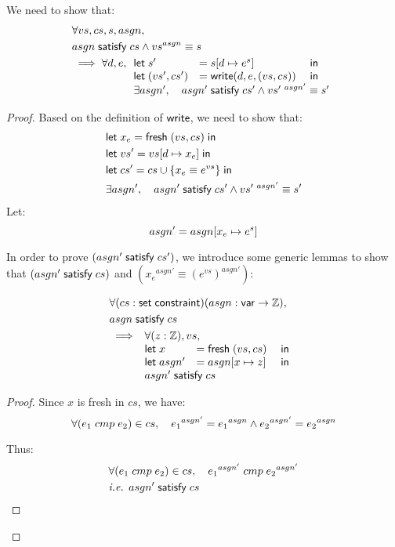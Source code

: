 We need to show that:
\begin{align*}
&\forall vs,cs,s,asgn,\\
&\satisfy{asgn}{cs}\wedge vs^{asgn}\equiv s\\
&\implies\forall d,e,\begin{array}[t]{lll}
\letin{s'&}{\update{s}{d}{e^s}&}\\
\letin{(vs',cs')&}{\Write(d,e,(vs,cs))&}\\
\multicolumn{3}{l}{\exists asgn',\quad\satisfy{asgn'}{cs'}\wedge vs'^{~asgn'}\equiv s'}
\end{array}
\end{align*}
\begin{proof}
Based on the definition of $\mathsf{write}$, we need to show that:
\begin{align*}&\letin{x_e}{\Fresh(vs,cs)}\\
&\letin{vs'}{\update{vs}{d}{x_e}}\\
&\letin{cs'}{cs\cup\{x_e\equiv e^{vs}\}}\\
&\exists asgn',\quad\satisfy{asgn'}{cs'}\wedge vs'^{~asgn'}\equiv s'
\end{align*}
Let:\[asgn'=asgn[x_e\mapsto e^{s}]\]

In order to prove $(asgn'\;\mathsf{satisfy}\;cs')$, we introduce some generic lemmas to
show that $(asgn'\;\mathsf{satisfy}\;cs)$ and $({x_e}^{asgn'}\equiv{(e^{vs})^{asgn'}})$:
\begin{lemma}
\label{lem:fresh-sat}
\begin{align*}
&\forall (cs:\Set\constraint)(asgn:\Var\to\Int),\\
&\satisfy{asgn}{cs}\\
&\implies
\begin{array}[t]{lll}
\multicolumn{3}{l}{\forall (z:\Int),vs,}\\
\letin{x&}{\Fresh(vs,cs)&}\\
\letin{asgn'&}{\update{asgn}{x}{z}&}\\
\multicolumn{3}{l}{\satisfy{asgn'}{cs}}
\end{array}
\end{align*}
\begin{proof}
Since $x$ is fresh in $cs$, we have:
\[\forall (e_1\;cmp\; e_2)\in cs,\quad{e_1}^{asgn'}={e_1}^{asgn}\wedge{e_2}^{asgn'}={e_2}^{asgn}\]

Thus:
\begin{align*}
&\forall (e_1\;cmp\; e_2)\in cs,\quad{e_1}^{asgn'}\;cmp\; {e_2}^{asgn'}\\
&\textit{i.e. }asgn'\;\mathsf{satisfy}\;cs
\end{align*}
\end{proof}
\end{lemma}


\end{proof}
